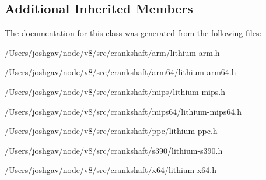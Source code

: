 \subsection*{Additional Inherited Members}


The documentation for this class was generated from the following files\+:\begin{DoxyCompactItemize}
\item 
/\+Users/joshgav/node/v8/src/crankshaft/arm/lithium-\/arm.\+h\item 
/\+Users/joshgav/node/v8/src/crankshaft/arm64/lithium-\/arm64.\+h\item 
/\+Users/joshgav/node/v8/src/crankshaft/mips/lithium-\/mips.\+h\item 
/\+Users/joshgav/node/v8/src/crankshaft/mips64/lithium-\/mips64.\+h\item 
/\+Users/joshgav/node/v8/src/crankshaft/ppc/lithium-\/ppc.\+h\item 
/\+Users/joshgav/node/v8/src/crankshaft/s390/lithium-\/s390.\+h\item 
/\+Users/joshgav/node/v8/src/crankshaft/x64/lithium-\/x64.\+h\end{DoxyCompactItemize}

